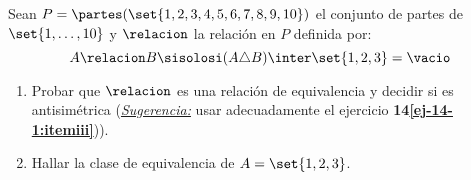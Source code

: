 \begin{enunciado}{\ejercicio}
  Sean $P = \partes(\set{1,2,3,4,5,6,7,8,9,10})$
  el conjunto de partes de $\set{1,\dots, 10}$ y $\relacion$ la relación en $P$ definida por:
  $$
    A \relacion B \sisolosi (A \triangle B) \inter \set{1,2,3} = \vacio
  $$
  \begin{enumerate}[label=\roman*)]

    \item  Probar que $\relacion$ es una relación de equivalencia y decidir si es antisimétrica
          (\textit{\underline{Sugerencia:}} usar adecuadamente el ejercicio \textbf{14\ref{ej-14-1:itemiii}})).
    \item Hallar la clase de equivalencia de $A = \set{1,2,3}$.
  \end{enumerate}
\end{enunciado}


